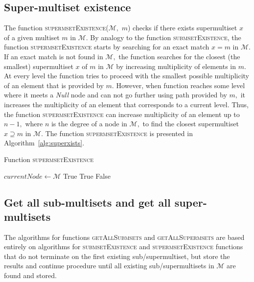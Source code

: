\subsection{Super-multiset existence} \label{s:superexists}
The function \textsc{supermsetExistence}($\mathcal{M},$ $m$) checks if there 
exists supermultiset $x$ of a given multiset $m$ in $\mathcal{M}.$ By analogy 
to the function \textsc{submsetExistence}, the function \textsc{supermsetExistence} 
starts by searching for an exact match $x=m$ in $\mathcal{M}.$ If an exact 
match is not found in $\mathcal{M},$ the function searches for the closest (the 
smallest) supermultiset $x$ of $m$ in $\mathcal{M}$ by increasing multiplicity 
of elements in $m.$ At every level the function tries to proceed with the smallest 
possible multiplicity of an element that is provided by $m.$ However, when function 
reaches some level where it meets a \emph{Null} node and can not go further 
using path provided by $m,$ it increases the multiplicity of an element that 
corresponds to a current level. Thus, the function \textsc{supermsetExistence} 
can increase multiplicity of an element up to $n-1,$ where $n$ is the degree of 
a node in $\mathcal{M},$ to find the closest supermultiset $x\supseteq m$ in 
$\mathcal{M}.$ The function \textsc{supermsetExistence} is presented in 
Algorithm~\ref{alg:superxists}.


\begin{algorithm}[h!]
\caption{Function \textsc{supermsetExistence}}
\label{alg:superxists}
\begin{algorithmic}[1]
\State $currentNode \gets \mathcal{M}$
\State \Return True
\EndIf
{}
\State \Return True
\EndIf
\EndIf
\EndFor
\State \Return False
\EndFunction
\end{algorithmic}
\end{algorithm}


\subsection{Get all sub-multisets and get all super-multisets} \label{s:getall}
The algorithms for functions \textsc{getAllSubmsets} and 
\textsc{getAllSupermsets} are based entirely on algorithms for 
\textsc{submsetExistence} and \textsc{supermsetExistence} functions that do not 
terminate on the first existing sub/supermultiset, but store the results and 
continue procedure until all existing sub/supermultisets in $\mathcal{M}$ are 
found and stored.